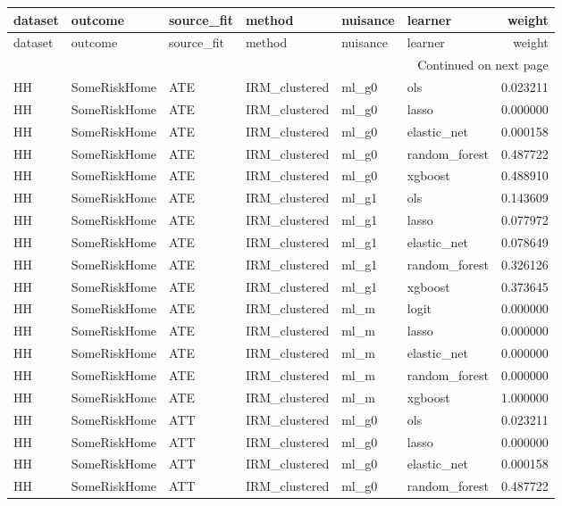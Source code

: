 \begin{longtable}{llllllr}
\toprule
dataset & outcome & source\_fit & method & nuisance & learner & weight \\
\midrule
\endfirsthead
\toprule
dataset & outcome & source\_fit & method & nuisance & learner & weight \\
\midrule
\endhead
\midrule
\multicolumn{7}{r}{Continued on next page} \\
\midrule
\endfoot
\bottomrule
\endlastfoot
HH & SomeRiskHome & ATE & IRM\_clustered & ml\_g0 & ols & 0.023211 \\
HH & SomeRiskHome & ATE & IRM\_clustered & ml\_g0 & lasso & 0.000000 \\
HH & SomeRiskHome & ATE & IRM\_clustered & ml\_g0 & elastic\_net & 0.000158 \\
HH & SomeRiskHome & ATE & IRM\_clustered & ml\_g0 & random\_forest & 0.487722 \\
HH & SomeRiskHome & ATE & IRM\_clustered & ml\_g0 & xgboost & 0.488910 \\
HH & SomeRiskHome & ATE & IRM\_clustered & ml\_g1 & ols & 0.143609 \\
HH & SomeRiskHome & ATE & IRM\_clustered & ml\_g1 & lasso & 0.077972 \\
HH & SomeRiskHome & ATE & IRM\_clustered & ml\_g1 & elastic\_net & 0.078649 \\
HH & SomeRiskHome & ATE & IRM\_clustered & ml\_g1 & random\_forest & 0.326126 \\
HH & SomeRiskHome & ATE & IRM\_clustered & ml\_g1 & xgboost & 0.373645 \\
HH & SomeRiskHome & ATE & IRM\_clustered & ml\_m & logit & 0.000000 \\
HH & SomeRiskHome & ATE & IRM\_clustered & ml\_m & lasso & 0.000000 \\
HH & SomeRiskHome & ATE & IRM\_clustered & ml\_m & elastic\_net & 0.000000 \\
HH & SomeRiskHome & ATE & IRM\_clustered & ml\_m & random\_forest & 0.000000 \\
HH & SomeRiskHome & ATE & IRM\_clustered & ml\_m & xgboost & 1.000000 \\
HH & SomeRiskHome & ATT & IRM\_clustered & ml\_g0 & ols & 0.023211 \\
HH & SomeRiskHome & ATT & IRM\_clustered & ml\_g0 & lasso & 0.000000 \\
HH & SomeRiskHome & ATT & IRM\_clustered & ml\_g0 & elastic\_net & 0.000158 \\
HH & SomeRiskHome & ATT & IRM\_clustered & ml\_g0 & random\_forest & 0.487722 \\

\end{longtable}
